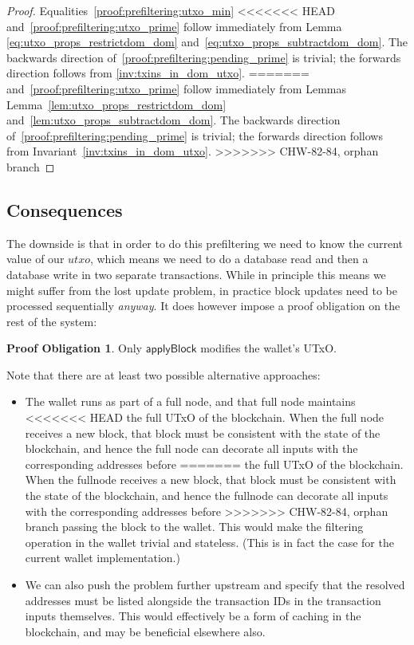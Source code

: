 \documentclass{article}
\theoremstyle{definition}{
  \newtheorem{lemma}{Lemma}[section] %
  \newtheorem{definition}[lemma]{Definition}
}
\theoremstyle{theorem}{
  \newtheorem{invariant}[lemma]{Invariant}
  \newtheorem{proofobligation}[lemma]{Proof Obligation}
}
\newtheorem{proofobligation}[lemma]{Proof Obligation}
\numberwithin{equation}{lemma}
\begin{document}
\begin{proof}

Equalities~\eqref{proof:prefiltering:utxo_min}
<<<<<<< HEAD
and~\eqref{proof:prefiltering:utxo_prime} follow immediately from Lemma
\eqref{eq:utxo_props_restrictdom_dom}
and~\eqref{eq:utxo_props_subtractdom_dom}. The backwards direction
of~\eqref{proof:prefiltering:pending_prime} is trivial; the forwards direction
follows from \cref{inv:txins_in_dom_utxo}.
=======
and~\eqref{proof:prefiltering:utxo_prime} follow immediately from Lemmas
Lemma~\ref{lem:utxo_props_restrictdom_dom}
and~\ref{lem:utxo_props_subtractdom_dom}. The backwards direction
of~\eqref{proof:prefiltering:pending_prime} is trivial; the forwards direction
follows from Invariant~\ref{inv:txins_in_dom_utxo}.
>>>>>>> CHW-82-84, orphan branch
\end{proof}

\subsection{Consequences}

The downside is that in order to do this prefiltering we need to know the
current value of our $utxo$, which means we need to do a database read and then
a database write in two separate transactions. While in principle this means
we might suffer from the lost update problem, in practice block updates need to
be processed sequentially \emph{anyway}. It does however impose a proof
obligation on the rest of the system:

\begin{proofobligation}
Only $\mathsf{applyBlock}$ modifies the wallet's UTxO.
\end{proofobligation}

Note that there are at least two possible alternative approaches:

\begin{itemize}
\item The wallet runs as part of a full node, and that full node maintains
<<<<<<< HEAD
the full UTxO of the blockchain. When the full node receives a new block,
that block must be consistent with the state of the blockchain, and hence
the full node can decorate all inputs with the corresponding addresses before
=======
the full UTxO of the blockchain. When the fullnode receives a new block,
that block must be consistent with the state of the blockchain, and hence
the fullnode can decorate all inputs with the corresponding addresses before
>>>>>>> CHW-82-84, orphan branch
passing the block to the wallet. This would make the filtering operation in
the wallet trivial and stateless. (This is in fact the case for the current
wallet implementation.)
\item We can also push the problem further upstream and specify that the
resolved addresses must be listed alongside the transaction IDs in the
transaction inputs themselves. This would effectively be a form of caching
in the blockchain, and may be beneficial elsewhere also.
\end{itemize}
\end{document}
